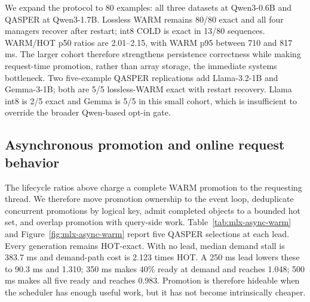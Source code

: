 \documentclass[10pt]{article}
\begin{document}
We expand the protocol to 80 examples: all three datasets at Qwen3-0.6B and
QASPER at Qwen3-1.7B. Lossless WARM remains 80/80 exact and all four managers
recover after restart; int8 COLD is exact in 13/80 sequences. WARM/HOT p50
ratios are 2.01--2.15, with WARM p95 between 710 and 817 ms. The larger cohort
therefore strengthens persistence correctness while making request-time
promotion, rather than array storage, the immediate systems bottleneck. Two
five-example QASPER replications add Llama-3.2-1B and Gemma-3-1B; both are 5/5
lossless-WARM exact with restart recovery. Llama int8 is 2/5 exact and Gemma is
5/5 in this small cohort, which is insufficient to override the broader
Qwen-based opt-in gate.

\begin{table}[!htbp]
\centering
\scriptsize
\caption{Expanded MLX lifecycle cohorts. Latencies include synchronous
promotion and generation; int8 remains diagnostic.}
\resizebox{\linewidth}{!}{%
}
\label{tab:mlx-storage-scaling}
\end{table}

\subsection{Asynchronous promotion and online request behavior}
The lifecycle ratios above charge a complete WARM promotion to the requesting
thread. We therefore move promotion ownership to the event loop, deduplicate
concurrent promotions by logical key, admit completed objects to a bounded hot
set, and overlap promotion with query-side work. Table~\ref{tab:mlx-async-warm}
and Figure~\ref{fig:mlx-async-warm} report five QASPER selections at each lead.
Every generation remains HOT-exact. With no lead, median demand stall is
383.7 ms and demand-path cost is 2.123 times HOT. A 250 ms lead lowers these to
90.3 ms and 1.310; 350 ms makes 40\% ready at demand and reaches 1.048; 500 ms
makes all five ready and reaches 0.983. Promotion is therefore hideable when
the scheduler has enough useful work, but it has not become intrinsically
cheaper.

\begin{table}[!htbp]
\centering
\scriptsize
\caption{Event-loop-owned WARM promotion. Lead and stall are milliseconds.}
\resizebox{\linewidth}{!}{%
}
\label{tab:mlx-async-warm}
\end{table}
\end{document}

